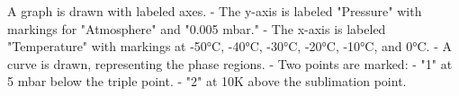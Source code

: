 A graph is drawn with labeled axes.  
- The y-axis is labeled "Pressure" with markings for "Atmosphere" and "0.005 mbar."  
- The x-axis is labeled "Temperature" with markings at -50°C, -40°C, -30°C, -20°C, -10°C, and 0°C.  
- A curve is drawn, representing the phase regions.  
- Two points are marked:  
  - "1" at 5 mbar below the triple point.  
  - "2" at 10K above the sublimation point.